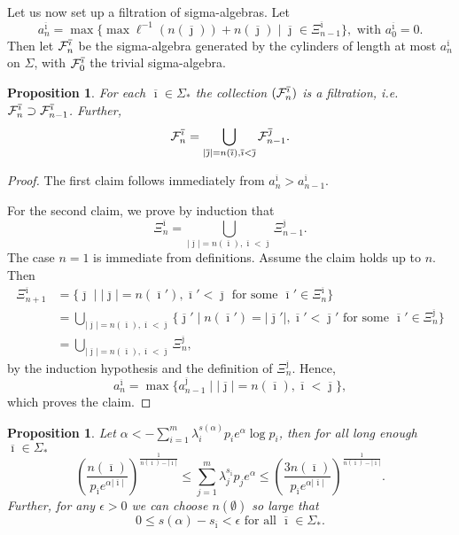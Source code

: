 \documentclass[12pt,]{article}
\newtheorem{proposition}[theorem]{Proposition}
\theoremstyle{definition}
\theoremstyle{remark}
\newcommand{\cF}{{\cal F}}
\newcommand{\0}{\mathbf{0}}
\renewcommand{\le}{\leq}
\newcommand{\bi}{{\overline {\imath}}}
\newcommand{\bj}{{\overline  {\jmath}}}
\begin{document}
Let us now set up a filtration of sigma-algebras. Let
\[
  a_n^\bi=\max\{\max \ell^{-1}(n(\bj))+n(\bj)\mid \bj \in \Xi^\bi_{n-1}\}, \text{ with }a_0^\bi=0.
\]
Then let $\cF_n^\bi$ be the sigma-algebra generated by the cylinders of length at most $a_n^\bi$ on
$\Sigma$, with $\cF_0^\bi$ the trivial sigma-algebra.

\begin{proposition}
  For each $\bi\in \Sigma_*$ the collection $(\cF_n^\bi)$ is a filtration, i.e. $\cF_{n}^\bi\supset
  \cF_{n-1}^\bi$. Further,
  \[
    \cF_n^\bi = \bigcup_{|\bj|=n(\bi), \bi<\bj}\cF_{n-1}^\bj.
  \]
\end{proposition}

\begin{proof}
  The first claim follows immediately from $a_{n}^\bi> a_{n-1}^\bi$.

  For the second claim, we prove by induction that
  \[
    \Xi_{n}^\bi=\bigcup_{|\bj|=n(\bi), \bi<\bj}\Xi_{n-1}^\bj.
  \]
  The case $n=1$ is immediate from definitions. Assume the claim holds up to $n$. Then
  \begin{align*}
    \Xi_{n+1}^\bi
    & = \{\bj\mid |\bj|=n(\bi'), \bi'<\bj \text{ for some }\bi'\in \Xi_{n}^\bi\}\\
    &=\bigcup_{|\bj|=n(\bi), \bi<\bj}\{\bj'\mid n(\bi')=|\bj'|, \bi'<\bj'\text{ for
    some }\bi'\in \Xi^{\bj}_n\}\\
    &=\bigcup_{|\bj|=n(\bi), \bi<\bj}\Xi^{\bj}_n,
  \end{align*}
  by the induction hypothesis and the definition of $\Xi_n^\bj$. Hence,
  \[
    a^\bi_n=\max \{a_{n-1}^\bj\mid |\bj|=n(\bi), \bi < \bj\},
  \]
  which proves the claim.
\end{proof}

\begin{proposition}
  Let $\alpha<-\sum_{i=1}^m \lambda_i^{s(\alpha)}p_ie^\alpha\log p_i$, then for all long enough $\bi\in \Sigma_*$
  \begin{equation}
    \left( \frac{n(\bi)}{p_\bi e^{\alpha|\bi|}}\right)^{\frac{1}{n(\bi) - |\bi|}}\le \sum_{j=1}^m
    \lambda_j^{s_\bi}p_j e^{\alpha}\le  \left( \frac{3 n(\bi)}{p_\bi
    e^{\alpha|\bi|}}\right)^{\frac{1}{n(\bi) - |\bi|}}.
    \label{eq:goodSumBound}
  \end{equation}
  Further, for any $\epsilon>0$ we can choose $n(\emptyset)$ so large that 
  \[
    0 \leq s(\alpha)-s_{\bi}<\epsilon \text{ for all } \bi \in \Sigma_*.
  \]
\end{proposition}
\end{document}
